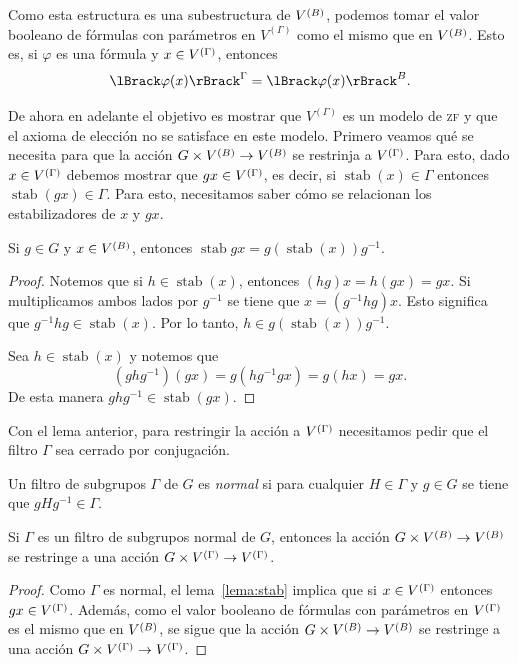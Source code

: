 \documentclass[letterpaper,DIV=15,12pt]{scrartcl}
\DeclarePairedDelimiter{\vb}{\lBrack}{\rBrack}             %
\DeclareMathOperator{\stab}{stab}                          %
\begin{document}
Como esta estructura es una subestructura de \(\mb\), podemos tomar el valor
booleano de fórmulas con parámetros en \(V^{(\Gamma)}\) como el mismo que en
\(\mb\). Esto es, si \(\varphi\) es una fórmula y \(x\in \mg\), entonces
\begin{equation*}
    \vb{\varphi(x)}^{\Gamma}=\vb{\varphi(x)}^{B}.
\end{equation*}

De ahora en adelante el objetivo es mostrar que \(V^{(\Gamma)}\) es un modelo de
\textsc{zf}  y que el axioma de elección no se satisface en este modelo. Primero
veamos qué se necesita para que la acción \(G\times\mb\to\mb\) se restrinja a
\(\mg\). Para esto, dado \(x\in\mg\) debemos mostrar que \(gx\in\mg\), es decir,
si \(\stab(x)\in\Gamma\) entonces \(\stab(gx)\in\Gamma\). Para esto, necesitamos
saber cómo se relacionan los estabilizadores de \(x\) y \(gx\).

\begin{lemma}[label=lema:stab]
    Si \(g\in G\) y \(x\in\mb\), entonces \(\stab{gx}=g(\stab(x))g^{-1}\).
\end{lemma}
\begin{proof}
    Notemos que si \(h\in\stab(x)\), entonces \((hg)x=h(gx)=gx\). Si
    multiplicamos ambos lados por \(g^{-1}\) se tiene que \(x=(g^{-1}hg)x\).
    Esto significa que \(g^{-1}hg\in\stab(x)\). Por lo tanto, 
    \(h\in g(\stab(x))g^{-1}\).
    
    Sea \(h\in\stab(x)\) y notemos que
    \begin{equation*}
        (ghg^{-1})(gx)=g(hg^{-1}gx)=g(hx)=gx.
    \end{equation*}
    De esta manera \(ghg^{-1}\in\stab(gx)\).
\end{proof}

Con el lema anterior, para restringir la acción a \(\mg\) necesitamos pedir que
el filtro \(\Gamma\) sea cerrado por conjugación.

\begin{definition}
    Un filtro de subgrupos \(\Gamma\) de \(G\) es \emph{normal}
    si para cualquier \(H\in\Gamma\) y \(g\in G\) se tiene que \(gHg^{-1}\in\Gamma\).
\end{definition}

\begin{corollary}
    Si \(\Gamma\) es un filtro de subgrupos normal de \(G\), entonces la acción
    \(G\times\mb\to\mb\) se restringe a una acción \(G\times\mg\to\mg\).
\end{corollary}
\begin{proof}
    Como \(\Gamma\) es normal, el lema~\ref{lema:stab} implica que si
    \(x\in\mg\) entonces \(gx\in\mg\). Además, como el valor booleano de
    fórmulas con parámetros en \(\mg\) es el mismo que en \(\mb\), se sigue que
    la acción \(G\times\mb\to\mb\) se restringe a una acción
    \(G\times\mg\to\mg\).
\end{proof}
\end{document}
